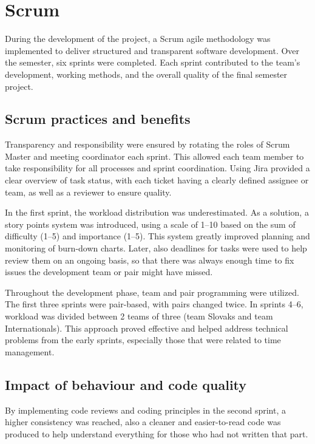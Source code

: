 
\section{Scrum}
During the development of the project, a Scrum agile methodology was implemented to deliver structured and transparent software development. Over the semester, six sprints were completed. Each sprint contributed to the team’s development, working methods, and the overall quality of the final semester project.

\subsection{Scrum practices and benefits}
Transparency and responsibility were ensured by rotating the roles of Scrum Master and meeting coordinator each sprint. This allowed each team member to take responsibility for all processes and sprint coordination. Using Jira provided a clear overview of task status, with each ticket having a clearly defined assignee or team, as well as a reviewer to ensure quality.

In the first sprint, the workload distribution was underestimated. As a solution, a story points system was introduced, using a scale of 1–10 based on the sum of difficulty (1–5) and importance (1–5). This system greatly improved planning and monitoring of burn-down charts. Later, also deadlines for tasks were used to help review them on an ongoing basis, so that there was always  enough time to fix issues the development team or pair might have missed.

Throughout the development phase, team and pair programming were utilized. The first three sprints were pair-based, with pairs changed twice. In sprints 4–6, workload was divided between 2 teams of three (team Slovaks and team Internationals). This approach proved effective and helped address technical problems from the early sprints, especially those that were related to time management.

\subsection{Impact of behaviour and code quality}
By implementing code reviews and coding principles in the second sprint, a higher consistency was reached, also a cleaner and easier-to-read code was produced to help understand everything for those who had not written that part.

